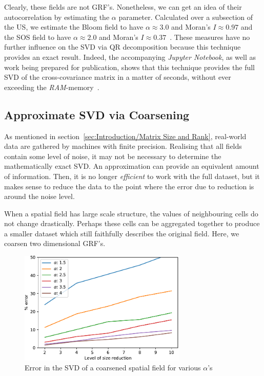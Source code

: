 \documentclass[ijgi,article,submit,moreauthors,pdftex,10pt,a4paper]{Definitions/mdpi}
\begin{document}
Clearly, these fields are not GRF's. Nonetheless, we can get an idea of their autocorrelation by estimating the $\alpha$ parameter. Calculated over a subsection of the US, we estimate the Bloom field to have $\alpha \approx 3.0$ and Moran's $I \approx 0.97$ and the SOS field to have $\alpha \approx 2.0$ and Moran's $I \approx 0.37$~\cite{Bogaardt2018}. These measures have no further influence on the SVD via QR decomposition because this technique provides an exact result. Indeed, the accompanying \textit{Jupyter Notebook}, as well as work being prepared for publication, shows that this technique provides the full SVD of the cross-covariance matrix in a matter of seconds, without ever exceeding the \textit{RAM}-memory~\cite{ZuritaMilla2018}.

\subsection{Approximate SVD via Coarsening}
\label{sec:Results/Approximate SVD via Coarsening}

As mentioned in section~\ref{sec:Introduction/Matrix Size and Rank}, real-world data are gathered by machines with finite precision. Realising that all fields contain some level of noise, it may not be necessary to determine the mathematically exact SVD. An approximation can provide an equivalent amount of information. Then, it is no longer \textit{efficient} to work with the full dataset, but it makes sense to reduce the data to the point where the error due to reduction is around the noise level.

When a spatial field has large scale structure, the values of neighbouring cells do not change drastically. Perhaps these cells can be aggregated together to produce a smaller dataset which still faithfully describes the original field. Here, we coarsen two dimensional GRF's.

\begin{figure}[H]
\centering
\includegraphics[width=80mm]{Results/plotSingleSpatialFieldViaCoarsening.pdf}
\caption[Error after coarsening]{Error in the SVD of a coarsened spatial field for various $\alpha$'s}
\label{fig:plotSingleSpatialFieldViaCoarsening}
\end{figure}
\end{document}
